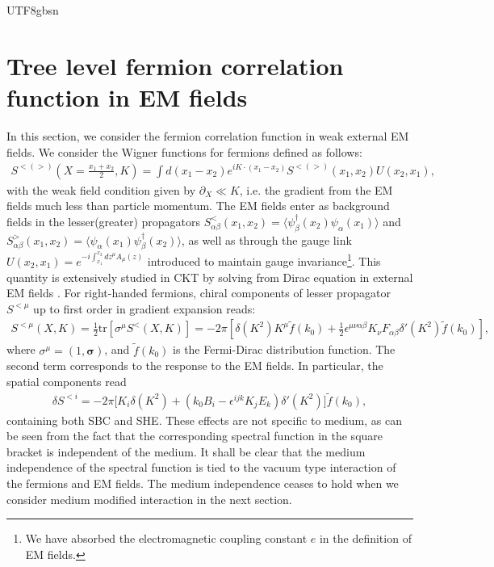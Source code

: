 \documentclass[11pt]{article}\def\baselinestretch{1.4}
\def\d{{\delta}}
\def\e{{\epsilon}}
\def\a{{\alpha}}
\def\b{{\beta}}
\def\p{{\pi}}
\def\m{{\mu}}
\def\s{{\sigma}}
\newcommand{\pd}{{\partial}}
\newcommand{\tr}{\text{tr}}
\begin{document}
\begin{CJK}{UTF8}{gbsn}
\section{Tree level fermion correlation function in EM fields}\label{sec_2}

In this section, we consider the fermion correlation function in weak external EM fields. %
We consider the Wigner functions for fermions defined as follows:
\begin{align}
    S^{<(>)}(X=\frac{x_1+x_2}{2}, K)= \int d(x_1-x_2) e^{i K \cdot (x_1-x_2)}S^{<(>)}(x_1,x_2)U(x_2,x_1),
\end{align}
with the weak field condition given by $\pd_X\ll K$, i.e. the gradient from the EM fields much less than particle momentum. The EM fields enter as background fields in the lesser(greater) propagators $S_{\a\b}^{<}(x_1,x_2)=\langle \psi^{\dagger} _\b(x_2)\psi_\a(x_1) \rangle$ and $S_{\a\b}^{>}(x_1,x_2)=\langle \psi_\a(x_1)\psi^{\dagger}_\b (x_2) \rangle$, as well as through the gauge link $U(x_2,x_1)=e^{-i\int_{x_1}^{x_2} dz^\m A_\m(z)}$ introduced to maintain gauge invariance\footnote{We have absorbed the electromagnetic coupling constant $e$ in the definition of EM fields.}. This quantity is extensively studied in CKT by solving from Dirac equation in external EM fields \cite{Hidaka:2016yjf, Hidaka:2017auj}. For right-handed fermions, chiral components of lesser propagator $S^{<\mu}$ up to first order in gradient expansion reads:
\begin{align}\label{Sless_CKT}
    S^{<\mu }(X, K)=\frac{1}{2}\tr[\s^\m S^<(X, K)] = -2\pi \left[\delta (K^2)K^\mu \tilde{f}(k_0) + \frac{1}{2}\epsilon^{\mu \nu \alpha \beta }K_\nu F_{\alpha \beta }\delta '(K^2) \tilde{f}(k_0) \right],
\end{align}
where $\sigma^\mu=(1,\boldsymbol{\sigma})$, and $\tilde{f}(k_0)$ is the Fermi-Dirac distribution function. The second term corresponds to the response to 
the EM fields. In particular, the spatial components read
\begin{align}\label{CKT_pol}
    \d S^{<i}=-2\p \big[K_i\d(K^2)+(k_0B_i-\e^{ijk}K_jE_k)\d'(K^2)\big]\tilde{f}(k_0),
\end{align}
containing both SBC and SHE. These effects are not specific to medium, as can be seen from the fact that the corresponding spectral function in the square bracket is independent of the medium. It shall be clear that the medium independence of the spectral function is tied to the vacuum type interaction of the fermions and EM fields. The medium independence ceases to hold when we consider medium modified interaction in the next section.


\end{CJK}
\end{document}

